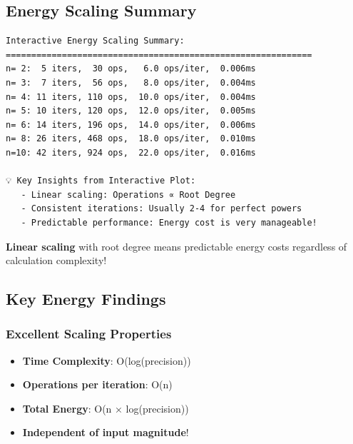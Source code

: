 \documentclass[
  letterpaper,
  DIV=11,
  numbers=noendperiod]{scrartcl}
\providecommand{\tightlist}{%
  \setlength{\itemsep}{0pt}\setlength{\parskip}{0pt}}
\begin{document}
\subsection{Energy Scaling Summary}\label{energy-scaling-summary}

\begin{verbatim}
Interactive Energy Scaling Summary:
============================================================
n= 2:  5 iters,  30 ops,   6.0 ops/iter,  0.006ms
n= 3:  7 iters,  56 ops,   8.0 ops/iter,  0.004ms
n= 4: 11 iters, 110 ops,  10.0 ops/iter,  0.004ms
n= 5: 10 iters, 120 ops,  12.0 ops/iter,  0.005ms
n= 6: 14 iters, 196 ops,  14.0 ops/iter,  0.006ms
n= 8: 26 iters, 468 ops,  18.0 ops/iter,  0.010ms
n=10: 42 iters, 924 ops,  22.0 ops/iter,  0.016ms

💡 Key Insights from Interactive Plot:
   - Linear scaling: Operations ∝ Root Degree
   - Consistent iterations: Usually 2-4 for perfect powers
   - Predictable performance: Energy cost is very manageable!
\end{verbatim}

\begin{tcolorbox}[enhanced jigsaw, bottomrule=.15mm, rightrule=.15mm, leftrule=.75mm, colbacktitle=quarto-callout-tip-color!10!white, coltitle=black, arc=.35mm, left=2mm, toptitle=1mm, colback=white, colframe=quarto-callout-tip-color-frame, breakable, toprule=.15mm, bottomtitle=1mm, title=\textcolor{quarto-callout-tip-color}{\faLightbulb}\hspace{0.5em}{Energy Efficiency Breakthrough!}, titlerule=0mm, opacitybacktitle=0.6, opacityback=0]

{\textbf{Linear scaling}} with root degree means predictable energy
costs regardless of calculation complexity!

\end{tcolorbox}

\subsection{Key Energy Findings}\label{key-energy-findings}

\subsubsection{\texorpdfstring{\textbf{Excellent Scaling
Properties}}{Excellent Scaling Properties}}\label{excellent-scaling-properties}

\begin{itemize}
\tightlist
\item
  \textbf{Time Complexity}: O(log(precision))
\item
  \textbf{Operations per iteration}: O(n)
\item
  \textbf{Total Energy}: O(n × log(precision))
\item
  \textbf{Independent of input magnitude}!
\end{itemize}
\end{document}
